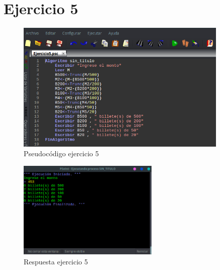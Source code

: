 \documentclass[11pt, a4paper]{report}
\begin{document}
\newpage
\section*{Ejercicio 5}

\begin{figure}[!ht]
\begin{center}
  \includegraphics[width=0.9\textwidth]{ejercicio5.png}
  \caption{Pseudoc\'odigo ejercicio 5}
\end{center}
\end{figure}

\begin{figure}[!ht]
\begin{center}
  \includegraphics[width=0.6\textwidth]{respuesta6.png}
  \caption{Respuesta ejercicio 5}
\end{center}
\end{figure}
\end{document}
